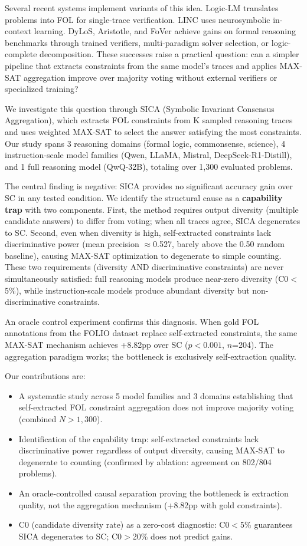 \documentclass[11pt,a4paper]{article}
\begin{document}
Several recent systems implement variants of this idea. Logic-LM \citep{pan2023logiclm} translates problems into FOL for single-trace verification. LINC \citep{olausson2023linc} uses neurosymbolic in-context learning. DyLoS, Aristotle, and FoVer achieve gains on formal reasoning benchmarks through trained verifiers, multi-paradigm solver selection, or logic-complete decomposition. These successes raise a practical question: can a simpler pipeline that extracts constraints from the same model's traces and applies MAX-SAT aggregation improve over majority voting without external verifiers or specialized training?

We investigate this question through SICA (Symbolic Invariant Consensus Aggregation), which extracts FOL constraints from K sampled reasoning traces and uses weighted MAX-SAT to select the answer satisfying the most constraints. Our study spans 3 reasoning domains (formal logic, commonsense, science), 4 instruction-scale model families (Qwen, LLaMA, Mistral, DeepSeek-R1-Distill), and 1 full reasoning model (QwQ-32B), totaling over 1,300 evaluated problems.

The central finding is negative: SICA provides no significant accuracy gain over SC in any tested condition. We identify the structural cause as a \textbf{capability trap} with two components. First, the method requires output diversity (multiple candidate answers) to differ from voting; when all traces agree, SICA degenerates to SC. Second, even when diversity is high, self-extracted constraints lack discriminative power (mean precision $\approx$0.527, barely above the 0.50 random baseline), causing MAX-SAT optimization to degenerate to simple counting. These two requirements (diversity AND discriminative constraints) are never simultaneously satisfied: full reasoning models produce near-zero diversity (C0$<$5\%), while instruction-scale models produce abundant diversity but non-discriminative constraints.

An oracle control experiment confirms this diagnosis. When gold FOL annotations from the FOLIO dataset replace self-extracted constraints, the same MAX-SAT mechanism achieves +8.82pp over SC ($p<0.001$, $n$=204). The aggregation paradigm works; the bottleneck is exclusively self-extraction quality.

Our contributions are:
\begin{itemize}
\item A systematic study across 5 model families and 3 domains establishing that self-extracted FOL constraint aggregation does not improve majority voting (combined $N>1{,}300$).
\item Identification of the capability trap: self-extracted constraints lack discriminative power regardless of output diversity, causing MAX-SAT to degenerate to counting (confirmed by ablation: agreement on 802/804 problems).
\item An oracle-controlled causal separation proving the bottleneck is extraction quality, not the aggregation mechanism (+8.82pp with gold constraints).
\item C0 (candidate diversity rate) as a zero-cost diagnostic: C0$<$5\% guarantees SICA degenerates to SC; C0$>$20\% does not predict gains.
\end{itemize}
\end{document}
